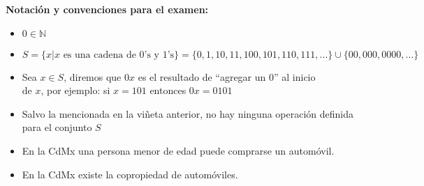 \documentclass[12pt, a4paper]{exam}
\begin{document}
    \textbf{Notación y convenciones para el examen:}
    {\tiny
    \begin{multicols}{2}
    \begin{itemize}\setlength\itemsep{0em}  
      \item $0\in\mathbb{N}$
      \item $S=\{x | x\text{ es una cadena de 0's y 1's}\} = \{0,1,10,11,100,101,110,111,...\}\cup\{00,000,0000,...\}$
      \item Sea $x\in S$, diremos que $0x$ es el resultado de ``agregar un $0$'' al inicio\\ de $x$, por ejemplo: si $x=101$ entonces $0x=0101$
      \item Salvo la mencionada en la viñeta anterior, no hay ninguna operación definida para el conjunto $S$
      \item En la CdMx una persona menor de edad puede comprarse un automóvil.
      \item En la CdMx existe la copropiedad de automóviles.
    \end{itemize}
    \end{multicols}
    }
\end{document}
